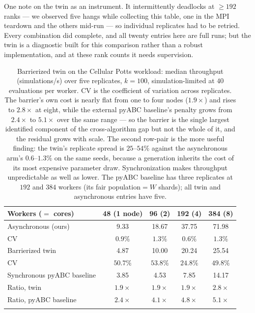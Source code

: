 One note on the twin as an instrument. It intermittently deadlocks at $\ge192$ ranks --- we observed five hangs while collecting this table, one in the MPI teardown and the others mid-run --- so individual replicates had to be retried. Every combination did complete, and all twenty entries here are full runs; but the twin is a diagnostic built for this comparison rather than a robust implementation, and at these rank counts it needs supervision.

\begin{table}[t]
\caption{Barrierized twin on the Cellular Potts workload: median throughput (simulations/s) over five replicates, $k{=}100$, simulation-limited at $40$ evaluations per worker. CV is the coefficient of variation across replicates. The barrier's own cost is nearly flat from one to four nodes ($1.9\times$) and rises to $2.8\times$ at eight, while the external pyABC baseline's penalty grows from $2.4\times$ to $5.1\times$ over the same range --- so the barrier is the single largest identified component of the cross-algorithm gap but not the whole of it, and the residual grows with scale. The second row-pair is the more useful finding: the twin's replicate spread is $25$--$54\%$ against the asynchronous arm's $0.6$--$1.3\%$ on the same seeds, because a generation inherits the cost of its most expensive parameter draw. Synchronization makes throughput unpredictable as well as lower. The pyABC baseline has three replicates at $192$ and $384$ workers (its fair population$=W$ shards); all twin and asynchronous entries have five.}\label{tab:twin-cpm}
\centering
\begin{tabular}{@{}lcccc@{}}
\toprule
Workers ($=$ cores) & 48 (1 node) & 96 (2) & 192 (4) & 384 (8) \\
\midrule
Asynchronous (ours)     & 9.33 & 18.67 & 37.75 & 71.98 \\
\quad CV                & $0.9\%$ & $1.3\%$ & $0.6\%$ & $1.3\%$ \\
Barrierized twin        & 4.87 & 10.00 & 20.24 & 25.54 \\
\quad CV                & $50.7\%$ & $53.8\%$ & $24.8\%$ & $49.8\%$ \\
Synchronous pyABC baseline & 3.85 & 4.53 & 7.85 & 14.17 \\
\midrule
Ratio, twin             & $1.9\times$ & $1.9\times$ & $1.9\times$ & $2.8\times$ \\
Ratio, pyABC baseline   & $2.4\times$ & $4.1\times$ & $4.8\times$ & $5.1\times$ \\
\botrule
\end{tabular}
\end{table}


